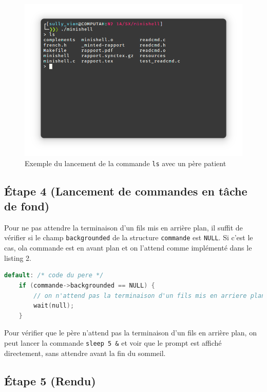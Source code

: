 \documentclass{article}
\begin{document}
\begin{figure}[H]
    \centering
    \includegraphics[width=1\textwidth]{./resources/E3.png}
    \caption{Exemple du lancement de la commande \texttt{ls} avec un père patient}
    \label{fig:E3}
\end{figure}

\subsection*{Étape 4 (Lancement de commandes en tâche de fond)}

Pour ne pas attendre la terminaison d'un fils mis en arrière plan, il suffit de vérifier si le champ \texttt{backgrounded} de la structure \texttt{commande} est \texttt{NULL}. Si c'est le cas, ola commande est en avant plan et on l'attend comme implémenté dans le listing 2.

\begin{lstlisting}[language=C, caption=Ajout pour la question 4]
default: /* code du pere */
    if (commande->backgrounded == NULL) {
        // on n'attend pas la terminaison d'un fils mis en arriere plan
        wait(null);
    }
\end{lstlisting}

Pour vérifier que le père n'attend pas la terminaison d'un fils en arrière plan, on peut lancer la commande \texttt{sleep 5 \&} et voir que le prompt est affiché directement, sans attendre avant la fin du sommeil.

\subsection*{Étape 5 (Rendu)}
\end{document}
